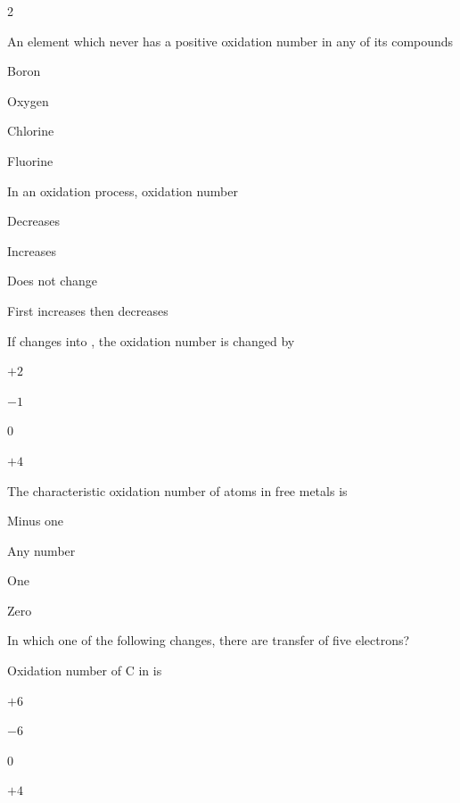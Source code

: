 \documentclass[10pt,a4paper]{article}
\begin{document}
\begin{multicols}{2}
\begin{questions}[start=1]
\item An element which never has a positive oxidation number in any of its compounds
\begin{options}
  \item Boron
  \item Oxygen
  \item Chlorine
  \item Fluorine
\end{options}

\item In an oxidation process, oxidation number
\begin{options}
  \item Decreases
  \item Increases
  \item Does not change
  \item First increases then decreases
\end{options}

\item If  changes into , the oxidation number is changed by
\begin{options}
  \item $+2$
  \item $-1$
  \item 0
  \item $+4$
\end{options}

\item The characteristic oxidation number of atoms in free metals is
\begin{options}
  \item Minus one
  \item Any number
  \item One
  \item Zero
\end{options}

\item In which one of the following changes, there are transfer of five electrons?
\begin{options}
  \item {}
  \item {}
  \item {}
  \item {}
\end{options}

\item Oxidation number of C in  is
\begin{options}
  \item $+6$
  \item $-6$
  \item 0
  \item $+4$
\end{options}


\end{questions}
\end{multicols}
\end{document}
